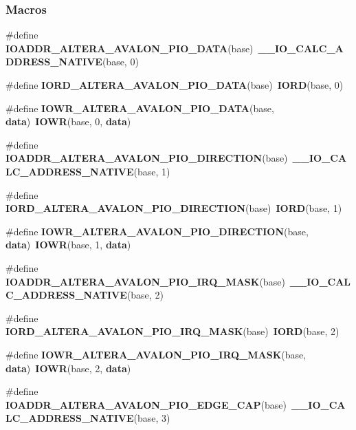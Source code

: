\subsubsection*{Macros}
\begin{DoxyCompactItemize}
\item 
\#define {\bf I\+O\+A\+D\+D\+R\+\_\+\+A\+L\+T\+E\+R\+A\+\_\+\+A\+V\+A\+L\+O\+N\+\_\+\+P\+I\+O\+\_\+\+D\+A\+TA}(base)~{\bf \+\_\+\+\_\+\+I\+O\+\_\+\+C\+A\+L\+C\+\_\+\+A\+D\+D\+R\+E\+S\+S\+\_\+\+N\+A\+T\+I\+VE}(base, 0)
\item 
\#define {\bf I\+O\+R\+D\+\_\+\+A\+L\+T\+E\+R\+A\+\_\+\+A\+V\+A\+L\+O\+N\+\_\+\+P\+I\+O\+\_\+\+D\+A\+TA}(base)~{\bf I\+O\+RD}(base, 0)
\item 
\#define {\bf I\+O\+W\+R\+\_\+\+A\+L\+T\+E\+R\+A\+\_\+\+A\+V\+A\+L\+O\+N\+\_\+\+P\+I\+O\+\_\+\+D\+A\+TA}(base,  {\bf data})~{\bf I\+O\+WR}(base, 0, {\bf data})
\item 
\#define {\bf I\+O\+A\+D\+D\+R\+\_\+\+A\+L\+T\+E\+R\+A\+\_\+\+A\+V\+A\+L\+O\+N\+\_\+\+P\+I\+O\+\_\+\+D\+I\+R\+E\+C\+T\+I\+ON}(base)~{\bf \+\_\+\+\_\+\+I\+O\+\_\+\+C\+A\+L\+C\+\_\+\+A\+D\+D\+R\+E\+S\+S\+\_\+\+N\+A\+T\+I\+VE}(base, 1)
\item 
\#define {\bf I\+O\+R\+D\+\_\+\+A\+L\+T\+E\+R\+A\+\_\+\+A\+V\+A\+L\+O\+N\+\_\+\+P\+I\+O\+\_\+\+D\+I\+R\+E\+C\+T\+I\+ON}(base)~{\bf I\+O\+RD}(base, 1)
\item 
\#define {\bf I\+O\+W\+R\+\_\+\+A\+L\+T\+E\+R\+A\+\_\+\+A\+V\+A\+L\+O\+N\+\_\+\+P\+I\+O\+\_\+\+D\+I\+R\+E\+C\+T\+I\+ON}(base,  {\bf data})~{\bf I\+O\+WR}(base, 1, {\bf data})
\item 
\#define {\bf I\+O\+A\+D\+D\+R\+\_\+\+A\+L\+T\+E\+R\+A\+\_\+\+A\+V\+A\+L\+O\+N\+\_\+\+P\+I\+O\+\_\+\+I\+R\+Q\+\_\+\+M\+A\+SK}(base)~{\bf \+\_\+\+\_\+\+I\+O\+\_\+\+C\+A\+L\+C\+\_\+\+A\+D\+D\+R\+E\+S\+S\+\_\+\+N\+A\+T\+I\+VE}(base, 2)
\item 
\#define {\bf I\+O\+R\+D\+\_\+\+A\+L\+T\+E\+R\+A\+\_\+\+A\+V\+A\+L\+O\+N\+\_\+\+P\+I\+O\+\_\+\+I\+R\+Q\+\_\+\+M\+A\+SK}(base)~{\bf I\+O\+RD}(base, 2)
\item 
\#define {\bf I\+O\+W\+R\+\_\+\+A\+L\+T\+E\+R\+A\+\_\+\+A\+V\+A\+L\+O\+N\+\_\+\+P\+I\+O\+\_\+\+I\+R\+Q\+\_\+\+M\+A\+SK}(base,  {\bf data})~{\bf I\+O\+WR}(base, 2, {\bf data})
\item 
\#define {\bf I\+O\+A\+D\+D\+R\+\_\+\+A\+L\+T\+E\+R\+A\+\_\+\+A\+V\+A\+L\+O\+N\+\_\+\+P\+I\+O\+\_\+\+E\+D\+G\+E\+\_\+\+C\+AP}(base)~{\bf \+\_\+\+\_\+\+I\+O\+\_\+\+C\+A\+L\+C\+\_\+\+A\+D\+D\+R\+E\+S\+S\+\_\+\+N\+A\+T\+I\+VE}(base, 3)
\item 

\end{DoxyCompactItemize}
